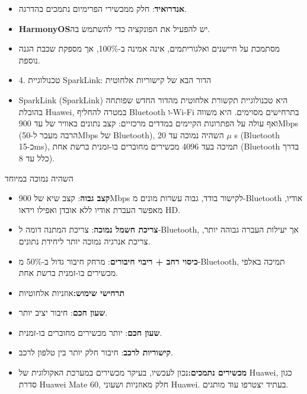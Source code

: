 
\begin{itemize}
  \item \textbf{אנדרואיד}: חלק ממכשירי הפרימיום נתמכים בהדרגה.
  \item \textbf{HarmonyOS}יש להפעיל את הפונקציה כדי להשתמש בה.
\end{itemize}


\begin{itemize}
  \item מסתמכת על חיישנים ואלגוריתמים, אינה אמינה ב-100\%, אך מספקת שכבת הגנה נוספת.
  \item 4. טכנולוגיית SparkLink: הדור הבא של קישוריות אלחוטית
  \item SparkLink (SparkLink) היא טכנולוגיית תקשורת אלחוטית מהדור החדש שפותחה בהובלת Huawei, במטרה להחליף Bluetooth ו-Wi-Fi בתרחישים מסוימים. היא משווה ואף עולה על הפתרונות הקיימים במדדים מרכזיים: קצב נתונים באוויר של עד 900Mbps (הרבה מעבר ל-50Mbps של Bluetooth), השהיה נמוכה עד 20 $\mu$ s (Bluetooth כ-15ms), תמיכה בעד 4096 מכשירים מחוברים בו-זמנית ברשת אחת (Bluetooth בדרך כלל עד 8).
\end{itemize}


השהיה נמוכה במיוחד


\begin{itemize}
  \item \textbf{קצב גבוה}: קצב שיא של 900Mbps לקישור בודד, גבוה עשרות מונים מ-Bluetooth אודיו, מאפשר העברת אודיו ללא אובדן ואפילו וידאו HD.
  \item \textbf{צריכת חשמל נמוכה}: צריכת המתנה דומה ל-Bluetooth, אך יעילות העברה גבוהה יותר, צריכת אנרגיה נמוכה יותר ליחידת נתונים.
  \item \textbf{כיסוי רחב + ריבוי חיבורים}: מרחק חיבור גדול ב-50\% מ-Bluetooth, תמיכה באלפי מכשירים בו-זמנית ברשת אחת.
  \item \textbf{תרחישי שימוש:}אוזניות אלחוטיות
\end{itemize}


\begin{itemize}
  \item \textbf{שעון חכם}: חיבור יציב יותר.
  \item \textbf{שעון חכם}: יותר מכשירים מחוברים בו-זמנית.
  \item \textbf{קישוריות לרכב}: חיבור חלק יותר בין טלפון לרכב.
  \item \textbf{מכשירים נתמכים:}נכון לעכשיו, בעיקר מכשירים במערכת האקולוגית של Huawei, כגון סדרת Huawei Mate 60, חלק מאוזניות ושעוני Huawei. בעתיד יצטרפו עוד מותגים.
\end{itemize}

